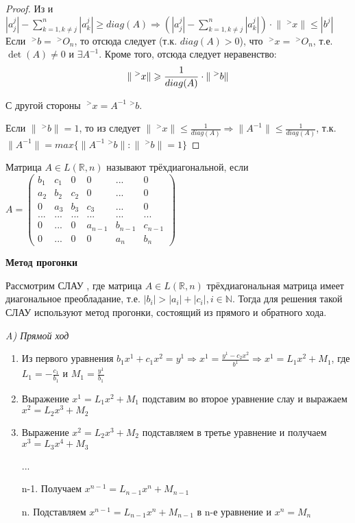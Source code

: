 \documentclass[__main__.tex]{subfiles}
\begin{document}
\begin{proof}
	Из  и $|a^j_j| - \sum_{k=1,k\neq j}^{n} |a^j_k| \geqslant diag(A) \Rightarrow (|a^j_j| - \sum_{k=1,k \neq j}^{n} |a^j_k|) \cdot \lVert \;^{>}x \rVert \leqslant |b^j|$
	Если $\;^{>}b = \;^{>}O_n$, то отсюда следует (т.к. $diag(A)>0$), что $\;^{>}x = \;^{>}O_n$, т.е. $\det(A) \neq 0$ и $\exists A^{-1}$. Кроме того, отсюда следует неравенство: 
	\begin{equation}
	\llabel{2_4}
	\lVert \;^{>}x \rVert \geqslant \frac{1}{diag(A)} \cdot \lVert \;^{>}b \rVert
	\end{equation}
	
	С другой стороны $\;^{>}x = A^{-1} \;^{>}b$.
	
	Если $\lVert \;^{>}b \rVert = 1$, то из  следует $\lVert \;^{>}x \rVert \leqslant \frac{1}{diag(A)} \Rightarrow \lVert A^{-1} \rVert \leqslant \frac{1}{diag(A)}$, т.к. $\lVert A^{-1} \rVert = max \lbrace \lVert A^{-1} \;^{>}b \rVert : \lVert \;^{>}b \rVert = 1 \rbrace$
\end{proof}

\begin{definition}
	Матрица $A \in L (\mathbb{R},n)$ называют трёхдиагональной, если $A = \left(
	\begin{matrix}
	b_1 & c_1 & 0 & 0 & ... & 0 \\
	a_2 & b_2 & c_2 & 0 &... & 0 \\
	0 & a_3 & b_3 & c_3 & ... & 0 \\
	... & ... & ... & ... & ... & ...\\
	0 & ... & 0 & a_{n-1} & b_{n-1} & c_{n-1} \\
	0 & ... & 0 & 0 & a_{n} & b_{n}
	\end{matrix}
	\right)$
\end{definition}

\textbf{Метод прогонки}

Рассмотрим СЛАУ , где матрица $A \in L(\mathbb{R},n)$ трёхдиагональная матрица имеет диагональное преобладание, т.е. $|b_i| >|a_i| + |c_i|, i \in \mathbb{N}$. Тогда для решения такой СЛАУ используют метод прогонки, состоящий из прямого и обратного хода.

\textit{A) Прямой ход}
\begin{enumerate}
	\item 
	Из первого уравнения $b_1 x^1 + c_1 x^2 =y^1 \Rightarrow x^1 = \frac{y^1 - c_2 x^2}{b^1} \Rightarrow x^1 = L_1 x^2 + M_1$, где $L_1 = - \frac{c_1}{b_1}$ и $M_1 = \frac{y^1}{b_1}$
	
	\item 
	Выражение $x^1 = L_1 x^2 + M_1$ подставим во второе уравнение слау и выражаем $x^2 = L_2 x^3 + M_2$
	
	\item
	Выражение $x^2 = L_2 x^3 + M_2$ подставляем в третье уравнение и получаем $x^3 = L_3 x^4 + M_3$
	
	...
	
	\item[n-1.]
	Получаем $x^{n-1} = L_{n-1} x^n + M_{n-1}$
	
	\item[n.]
	Подставляем $x^{n-1} = L_{n-1} x^n + M_{n-1}$ в n-е уравнение и $x^n = M_n$
\end{enumerate} 
\end{document}
